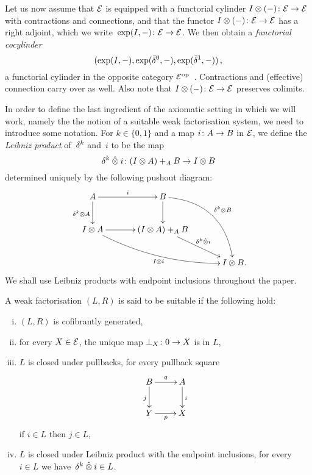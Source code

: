 \documentclass[reqno,10pt,a4paper,oneside,draft]{amsart}
\begin{document}
Let us now assume that $\catE$ is equipped with a functorial cylinder $\interval\otimes (-) \co \catE \to \catE$ with contractions and connections, and that the functor $\interval\otimes (-) \co \catE \to \catE$ has a right adjoint, which we write~$\exp(I, -) \co \catE \to \catE$.  We then obtain a \emph{functorial cocylinder} 
\[
(\exp(\interval, -), \exp(\bar{\delta}^0, -), \exp(\bar{\delta}^1, -)) \, ,
\]
\ie a functorial cylinder in the opposite category $\catE^{\op}$~\cite{kamps-porter:homotopy}.
 Contractions and (effective) connection carry over as well. Also note that $\interval\otimes (-) \co \catE \to \catE$ preserves colimits. 
 

In order to define the last ingredient of the axiomatic setting in which we will work, namely the the notion of a suitable weak factorisation system, we need to introduce some notation.  For $k \in \{ 0, 1\}$ and a map $i \co A \to B$ in $\catE$, we define the \emph{Leibniz product} of~$\kcyl$ and~$i$ to be the map 
\[
\kcyl \hatotimes i \co (\interval \otimes A) +_A B \to \interval \otimes B
\] 
determined uniquely by the following pushout diagram:
\begin{gather*}
\xymatrix@C=1.2cm{
  A
  \ar[r]^{i}
  \ar[d]_{\kcyl \otimes A}
&
  B
  \ar@/^2pc/[ddr]^{\kcyl \otimes B}
  \ar[d]
&\\
  \interval \otimes A
  \ar@/_1pc/[drr]_{\interval \otimes i}
  \ar[r]
&
  (\interval \otimes A) +_A B
  \ar[dr]^-{\delta^k \hatotimes i}
&\\&&
  \interval \otimes B
\rlap{.}}
\end{gather*}
We shall use Leibniz products with endpoint inclusions throughout the paper. 




\begin{definition} \label{thm:suitable-wfs} A weak factorisation $(L, R)$ is said to be suitable if the following hold:
\begin{enumerate}[(i)]
 \item $(L,R)$  is cofibrantly generated,
\item for every $X \in \cal{E}$, the unique map $\bot_X \co 0 \to X$ is in $L$,
 \item $L$ is closed under pullbacks, \ie for every pullback square
\[
\xymatrix{
B \ar[d]_j \ar[r]^q & A \ar[d]^i \\
Y \ar[r]_p & X }
\]
if $i \in L$ then $j \in L$, 
\item $L$ is closed under Leibniz product with the endpoint inclusions, \ie for every $i \in L$ we 
have~$\kcyl \hatotimes i \in L$.
\end{enumerate}
\end{definition}
\end{document}
